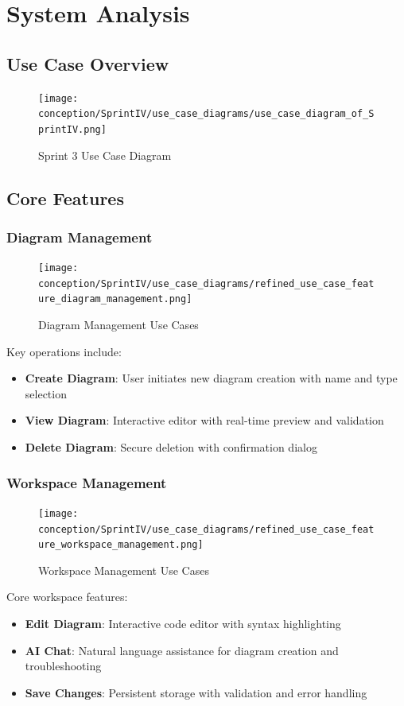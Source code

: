 \section{System Analysis}

\subsection{Use Case Overview}

\begin{figure}[H]
\centering
\texttt{[image: conception/SprintIV/use\_case\_diagrams/use\_case\_diagram\_of\_SprintIV.png]}
\caption{Sprint 3 Use Case Diagram}
\end{figure}

\subsection{Core Features}

\subsubsection{Diagram Management}
\begin{figure}[H]
\centering
\texttt{[image: conception/SprintIV/use\_case\_diagrams/refined\_use\_case\_feature\_diagram\_management.png]}
\caption{Diagram Management Use Cases}
\end{figure}

Key operations include:
\begin{itemize}
    \item \textbf{Create Diagram}: User initiates new diagram creation with name and type selection
    \item \textbf{View Diagram}: Interactive editor with real-time preview and validation
    \item \textbf{Delete Diagram}: Secure deletion with confirmation dialog
\end{itemize}

\subsubsection{Workspace Management}
\begin{figure}[H]
\centering
\texttt{[image: conception/SprintIV/use\_case\_diagrams/refined\_use\_case\_feature\_workspace\_management.png]}
\caption{Workspace Management Use Cases}
\end{figure}

Core workspace features:
\begin{itemize}
    \item \textbf{Edit Diagram}: Interactive code editor with syntax highlighting
    \item \textbf{AI Chat}: Natural language assistance for diagram creation and troubleshooting
    \item \textbf{Save Changes}: Persistent storage with validation and error handling
\end{itemize}

